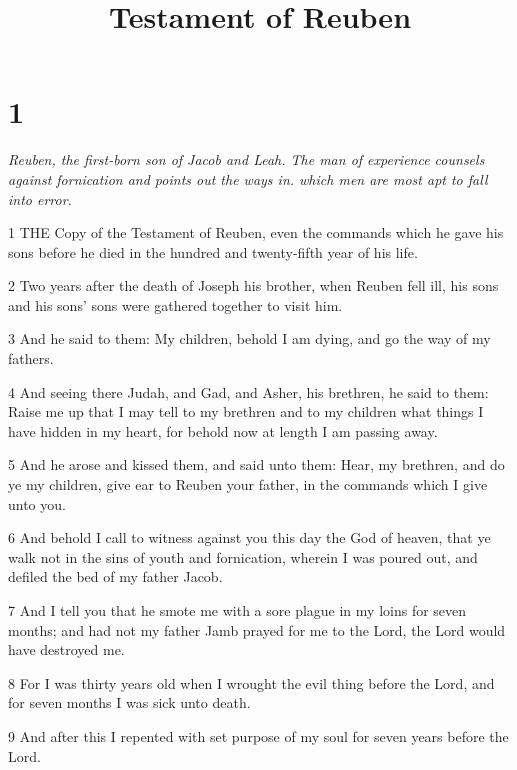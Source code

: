 

\title{Testament of Reuben}

\chapter{1}

\par \textit{Reuben, the first-born son of Jacob and Leah. The man of experience counsels against fornication and points out the ways in. which men are most apt to fall into error.}

\par 1 THE Copy of the Testament of Reuben, even the commands which he gave his sons before he died in the hundred and twenty-fifth year of his life.

\par 2 Two years after the death of Joseph his brother, when Reuben fell ill, his sons and his sons' sons were gathered together to visit him.

\par 3 And he said to them: My children, behold I am dying, and go the way of my fathers.

\par 4 And seeing there Judah, and Gad, and Asher, his brethren, he said to them: Raise me up that I may tell to my brethren and to my children what things I have hidden in my heart, for behold now at length I am passing away.

\par 5 And he arose and kissed them, and said unto them: Hear, my brethren, and do ye my children, give ear to Reuben your father, in the commands which I give unto you.

\par 6 And behold I call to witness against you this day the God of heaven, that ye walk not in the sins of youth and fornication, wherein I was poured out, and defiled the bed of my father Jacob.

\par 7 And I tell you that he smote me with a sore plague in my loins for seven months; and had not my father Jamb prayed for me to the Lord, the Lord would have destroyed me.

\par 8 For I was thirty years old when I wrought the evil thing before the Lord, and for seven months I was sick unto death.

\par 9 And after this I repented with set purpose of my soul for seven years before the Lord.

